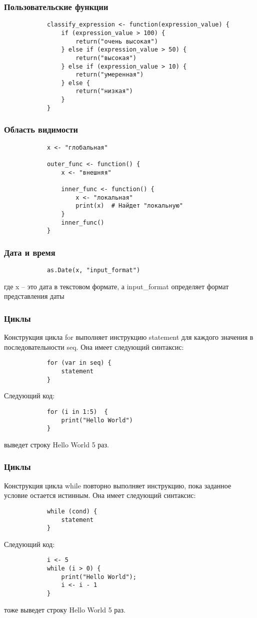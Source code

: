 \documentclass[10pt]{beamer}
\begin{document}
	\begin{frame}[fragile]
		\frametitle{Пользовательские функции}
		\begin{verbatim}
			classify_expression <- function(expression_value) {
				if (expression_value > 100) {
					return("очень высокая")
				} else if (expression_value > 50) {
					return("высокая")
				} else if (expression_value > 10) {
					return("умеренная") 
				} else {
					return("низкая")
				}
			}
		\end{verbatim}
	\end{frame}
	
	\begin{frame}[fragile]
		\frametitle{Область видимости}
		\begin{verbatim}
			x <- "глобальная"
			
			outer_func <- function() {
				x <- "внешняя"
				
				inner_func <- function() {
					x <- "локальная"
					print(x)  # Найдет "локальную"
				}
				inner_func()
			}
		\end{verbatim}
	\end{frame}
	
	\begin{frame}[fragile]
		\frametitle{Дата и время}
		\begin{verbatim}
			as.Date(x, "input_format")
		\end{verbatim} 	
		где x – это дата в текстовом формате, а input\_format определяет формат представления даты
	\end{frame}
	
	\begin{frame}[fragile]
		\frametitle{Циклы}
		Конструкция цикла for выполняет инструкцию statement для каждого значения в последовательности seq. Она имеет следующий синтаксис:
		\begin{verbatim}
			for (var in seq) {
				statement
			}
		\end{verbatim}
		Следующий код:
		\begin{verbatim}
			for (i in 1:5)  {
				print("Hello World")
			}
		\end{verbatim}
		выведет строку Hello World 5 раз.
	\end{frame}
	
	\begin{frame}[fragile]
		\frametitle{Циклы}
		Конструкция цикла while повторно выполняет инструкцию, пока заданное условие остается истинным. Она имеет следующий синтаксис:
		\begin{verbatim}
			while (cond) {
				statement
			}
		\end{verbatim}
		Следующий код:
		\begin{verbatim}	
			i <- 5
			while (i > 0) {
				print("Hello World"); 
				i <- i - 1
			}
		\end{verbatim}	
		тоже выведет строку Hello World 5 раз.
	\end{frame}
	
	
\end{document}
